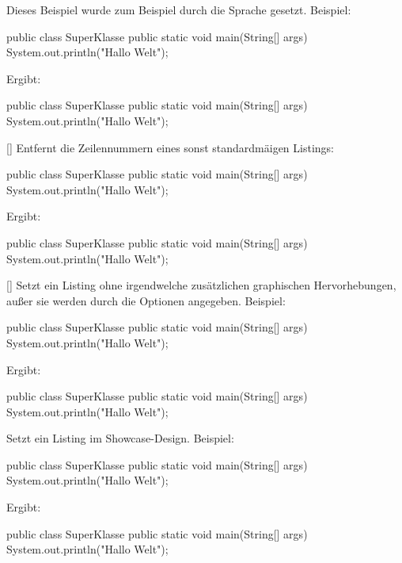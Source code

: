 Dieses Beispiel wurde zum Beispiel durch die Sprache  gesetzt. Beispiel:
\begin{latex}
\begin{java}
public class SuperKlasse {
    public static void main(String[] args) {
        System.out.println("Hallo Welt");
    }
}
\end{java}
\end{latex}
Ergibt:
\begin{java}
public class SuperKlasse {
    public static void main(String[] args) {
        System.out.println("Hallo Welt");
    }
}
\end{java}
%
%
%
[]
Entfernt die Zeilennummern eines sonst standardmäigen Listings:
\begin{latex}
\begin{java*}
public class SuperKlasse {
    public static void main(String[] args) {
        System.out.println("Hallo Welt");
    }
}
\end{java*}
\end{latex}
Ergibt:
\begin{java*}
public class SuperKlasse {
    public static void main(String[] args) {
        System.out.println("Hallo Welt");
    }
}
\end{java*}
%
%
%
[]
Setzt ein Listing ohne irgendwelche zusätzlichen graphischen Hervorhebungen, außer sie werden durch die Optionen angegeben. Beispiel:
\begin{latex}
\begin{plainjava}
public class SuperKlasse {
    public static void main(String[] args) {
        System.out.println("Hallo Welt");
    }
}
\end{plainjava}
\end{latex}
Ergibt:
\begin{plainjava}
public class SuperKlasse {
    public static void main(String[] args) {
        System.out.println("Hallo Welt");
    }
}
\end{plainjava}
%
%
%
Setzt ein Listing im Showcase-Design. Beispiel:
\begin{latex}
\begin{sjava}
public class SuperKlasse {
    public static void main(String[] args) {
        System.out.println("Hallo Welt");
    }
}
\end{sjava}
\end{latex}
Ergibt:
\begin{sjava}
public class SuperKlasse {
    public static void main(String[] args) {
        System.out.println("Hallo Welt");
    }
}
\end{sjava}

